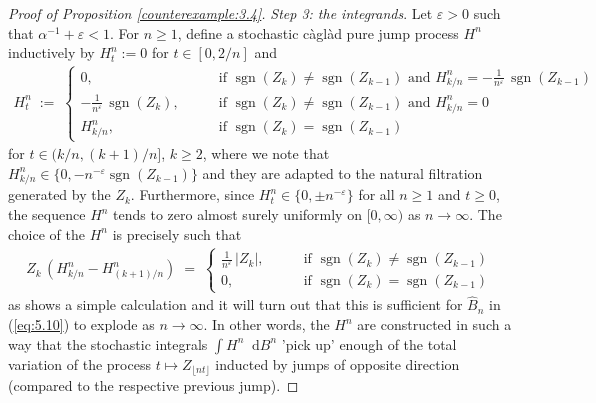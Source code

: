 \documentclass[11pt]{article}
\theoremstyle{definition}\newtheorem{example}[theorem]{Example}
\theoremstyle{definition}\newtheorem{counterexample}[theorem]{Counterexample}
\theoremstyle{definition}\newtheorem{remark}[theorem]{Remark}
\theoremstyle{definition}\newtheorem{defi}[theorem]{Definition}
\numberwithin{equation}{section}
\newcommand*\diff{\mathop{}\!\mathrm{d}}								%
\renewcommand{\|}{\; : \, \;}											%
\begin{document}
\begin{proof}[Proof of Proposition \ref{counterexample:3.4}]
	
	\phantom{ee} \emph{Step 3: the integrands}.
	Let $\varepsilon>0$ such that $\alpha^{-1}+ \varepsilon < 1$. For $n \ge 1$, define a stochastic càglàd pure jump process $H^n$ inductively by $H_t^n:= 0$ for $t \in [0, 2/n]$
	and 
	\begin{align*} H^n_t \; := \; \begin{cases}
			0, \qquad &\text{if } \operatorname{sgn}(Z_k)\neq \operatorname{sgn}(Z_{k-1}) \text{ and } H^n_{k/n}=- \frac{1}{n^\varepsilon} \, \operatorname{sgn}(Z_{k-1}) \\
			- \frac{1}{n^\varepsilon} \, \operatorname{sgn}(Z_{k}), \qquad &\text{if } \operatorname{sgn}(Z_k)\neq \operatorname{sgn}(Z_{k-1}) \text{ and } H^n_{k/n}=0 \\
			H^n_{k/n}, \qquad &\text{if } \operatorname{sgn}(Z_k)= \operatorname{sgn}(Z_{k-1})
	\end{cases} \end{align*}
	for $t \in (k/n,(k+1)/n]$, $k \ge 2$, where we note that $H^n_{k/n} \in \{0, -n^{-\varepsilon} \operatorname{sgn}(Z_{k-1})\}$ and they are adapted to the natural filtration generated by the $Z_k$. Furthermore, since $H^n_t \in \{0, \pm n^{-\varepsilon}\}$ for all $n\ge 1$ and $t\ge 0$, the sequence $H^n$ tends to zero almost surely uniformly on $[0,\infty)$ as $n\to \infty$. The choice of the $H^n$ is precisely such that 
	\begin{align} Z_k \, (H^n_{k/n} - H^n_{(k+1)/n})\; = \; \begin{cases}
			\frac{1}{n^\varepsilon} \, |Z_k|, \qquad &\text{if } \operatorname{sgn}(Z_k)\neq \operatorname{sgn}(Z_{k-1}) \\
			0, \qquad &\text{if } \operatorname{sgn}(Z_k) = \operatorname{sgn}(Z_{k-1}) 
		\end{cases} \label{eq:countex_summands}
	\end{align}
	as shows a simple calculation and it will turn out that this is sufficient for $\hat{B}_n$ in (\ref{eq:5.10}) to explode as $n\to \infty$. In other words, the $H^n$ are constructed in such a way that the stochastic integrals $\int H^n \diff B^n$ 'pick up' enough of the total variation of the process $t\mapsto Z_{\lfloor n t\rfloor}$ inducted by jumps of opposite direction (compared to the respective previous jump).
	

\end{proof}
\end{document}
